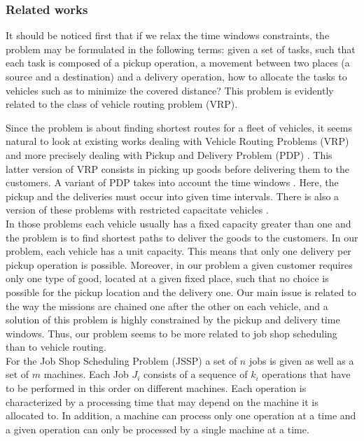 \documentclass[a4paper,10pt]{article}
\begin{document}
\subsubsection{Related works}

It should be noticed first that if we relax the time windows constraints, the problem may be formulated in the following terms: given a set of tasks, such that each task is composed of a pickup operation, a movement between two places (a source and a destination) and a delivery operation, how to allocate the tasks to vehicles such as to minimize the covered distance? This problem is evidently related to the class of vehicle routing problem (VRP). 


Since the problem is about finding shortest routes for a fleet of vehicles, it seems natural to look at existing works dealing with Vehicle Routing Problems (VRP) \cite{Toth2001,Laporte1992} and more precisely dealing with Pickup and Delivery Problem (PDP) \cite{Berbeglia2007}. This latter version of VRP consists in picking up goods before delivering them to the customers. A variant of PDP takes into account the time windows \cite{Mitrovic1998}. Here, the pickup and the deliveries must occur into given time intervals. There is also a version of these problems with restricted capacitate vehicles \cite{Toth2001}. \\

In those problems each vehicle usually has a fixed capacity greater than one and the problem is to find shortest paths to deliver the goods to the customers. In our problem, each vehicle has a unit capacity. This means that only one delivery per pickup operation is possible. Moreover, in our problem a given customer requires only one type of good, located at a given fixed place, such that no choice is possible for the pickup location and the delivery one. Our main issue is related to the way the missions are chained one after the other on each vehicle, and a solution of this problem is highly constrained by the pickup and delivery time windows. Thus, our problem seems to be more related to job shop scheduling than to vehicle routing.\\

For the Job Shop Scheduling Problem (JSSP) a set of $n$ jobs is given as well as a set of $m$ machines. Each Job $J_i$ consists of a sequence of $k_i$ operations that have to be performed in this order on different machines. Each operation is characterized by a processing time that may depend on the machine it is allocated to. In addition, a machine can process only one operation at a time and a given operation can only be processed by a single machine at a time. \\
\end{document}
